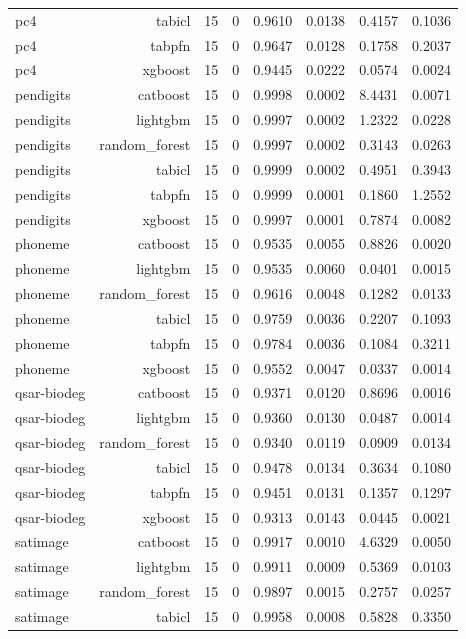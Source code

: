 \begin{table}[htbp]
\begin{tabular}{lrrrrrrr}
pc4 & tabicl & 15 & 0 & 0.9610 & 0.0138 & 0.4157 & 0.1036 \\
pc4 & tabpfn & 15 & 0 & 0.9647 & 0.0128 & 0.1758 & 0.2037 \\
pc4 & xgboost & 15 & 0 & 0.9445 & 0.0222 & 0.0574 & 0.0024 \\
pendigits & catboost & 15 & 0 & 0.9998 & 0.0002 & 8.4431 & 0.0071 \\
pendigits & lightgbm & 15 & 0 & 0.9997 & 0.0002 & 1.2322 & 0.0228 \\
pendigits & random\_forest & 15 & 0 & 0.9997 & 0.0002 & 0.3143 & 0.0263 \\
pendigits & tabicl & 15 & 0 & 0.9999 & 0.0002 & 0.4951 & 0.3943 \\
pendigits & tabpfn & 15 & 0 & 0.9999 & 0.0001 & 0.1860 & 1.2552 \\
pendigits & xgboost & 15 & 0 & 0.9997 & 0.0001 & 0.7874 & 0.0082 \\
phoneme & catboost & 15 & 0 & 0.9535 & 0.0055 & 0.8826 & 0.0020 \\
phoneme & lightgbm & 15 & 0 & 0.9535 & 0.0060 & 0.0401 & 0.0015 \\
phoneme & random\_forest & 15 & 0 & 0.9616 & 0.0048 & 0.1282 & 0.0133 \\
phoneme & tabicl & 15 & 0 & 0.9759 & 0.0036 & 0.2207 & 0.1093 \\
phoneme & tabpfn & 15 & 0 & 0.9784 & 0.0036 & 0.1084 & 0.3211 \\
phoneme & xgboost & 15 & 0 & 0.9552 & 0.0047 & 0.0337 & 0.0014 \\
qsar-biodeg & catboost & 15 & 0 & 0.9371 & 0.0120 & 0.8696 & 0.0016 \\
qsar-biodeg & lightgbm & 15 & 0 & 0.9360 & 0.0130 & 0.0487 & 0.0014 \\
qsar-biodeg & random\_forest & 15 & 0 & 0.9340 & 0.0119 & 0.0909 & 0.0134 \\
qsar-biodeg & tabicl & 15 & 0 & 0.9478 & 0.0134 & 0.3634 & 0.1080 \\
qsar-biodeg & tabpfn & 15 & 0 & 0.9451 & 0.0131 & 0.1357 & 0.1297 \\
qsar-biodeg & xgboost & 15 & 0 & 0.9313 & 0.0143 & 0.0445 & 0.0021 \\
satimage & catboost & 15 & 0 & 0.9917 & 0.0010 & 4.6329 & 0.0050 \\
satimage & lightgbm & 15 & 0 & 0.9911 & 0.0009 & 0.5369 & 0.0103 \\
satimage & random\_forest & 15 & 0 & 0.9897 & 0.0015 & 0.2757 & 0.0257 \\
satimage & tabicl & 15 & 0 & 0.9958 & 0.0008 & 0.5828 & 0.3350 \\

\end{tabular}
\end{table}
